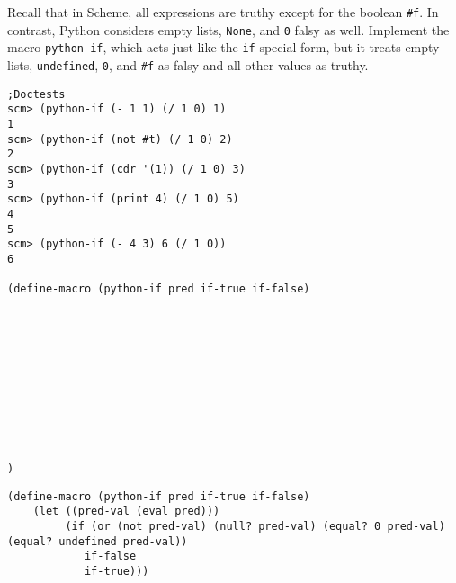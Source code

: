 \begin{blocksection}
\question Recall that in Scheme, all expressions are truthy except for the boolean \lstinline{#f}. In contrast, Python considers empty lists, \lstinline{None}, and \lstinline{0} falsy as well. Implement the macro \lstinline{python-if}, which acts just like the \lstinline{if} special form, but it treats empty lists, \lstinline{undefined}, \lstinline{0}, and \lstinline{#f} as falsy and all other values as truthy. 

\begin{lstlisting}
;Doctests
scm> (python-if (- 1 1) (/ 1 0) 1)
1
scm> (python-if (not #t) (/ 1 0) 2)
2
scm> (python-if (cdr '(1)) (/ 1 0) 3)
3
scm> (python-if (print 4) (/ 1 0) 5)
4
5
scm> (python-if (- 4 3) 6 (/ 1 0))
6

(define-macro (python-if pred if-true if-false)











)
\end{lstlisting}
\end{blocksection}

\begin{solution}
\begin{lstlisting}
(define-macro (python-if pred if-true if-false)
    (let ((pred-val (eval pred)))
         (if (or (not pred-val) (null? pred-val) (equal? 0 pred-val) (equal? undefined pred-val))
            if-false
            if-true)))
\end{lstlisting}
\end{solution}

